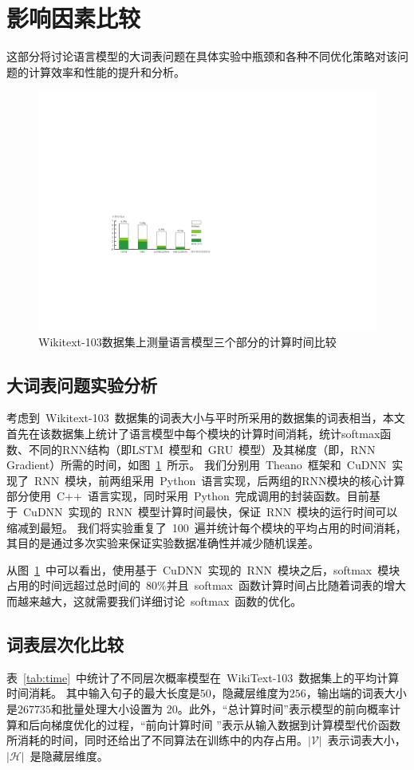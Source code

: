 \section{影响因素比较}

这部分将讨论语言模型的大词表问题在具体实验中瓶颈和各种不同优化策略对该问题的计算效率和性能的提升和分析。
\begin{figure}[!b]
  \centering
  \includegraphics[width=.9\columnwidth]{./figures/rnn_timing.pdf}
  \caption{Wikitext-103数据集上测量语言模型三个部分的计算时间比较}\label{fig:rnn_timing}
\end{figure}
\subsection{大词表问题实验分析}

考虑到~Wikitext-103~数据集的词表大小与平时所采用的数据集的词表相当，本文首先在该数据集上统计了语言模型中每个模块的计算时间消耗，统计softmax函数、不同的RNN结构（即LSTM~模型和~GRU~模型）及其梯度（即，RNN Gradient）所需的时间，如图~\ref{fig:rnn_timing}~所示。
我们分别用~Theano~框架和~CuDNN~实现了~RNN~模块，前两组采用~Python~语言实现，后两组的RNN模块的核心计算部分使用~C++~语言实现，同时采用~Python~完成调用的封装函数。目前基于~CuDNN~实现的~RNN~模型计算时间最快，保证~RNN~模块的运行时间可以缩减到最短。 我们将实验重复了~100~遍并统计每个模块的平均占用的时间消耗，其目的是通过多次实验来保证实验数据准确性并减少随机误差。


从图~\ref{fig:rnn_timing}~中可以看出，使用基于~CuDNN~实现的~RNN~模块之后，softmax~模块占用的时间远超过总时间的~80\%并且~softmax~函数计算时间占比随着词表的增大而越来越大，这就需要我们详细讨论~softmax~函数的优化。


\subsection{词表层次化比较}
表~\ref{tab:time}~中统计了不同层次概率模型在~WikiText-103~数据集上的平均计算时间消耗。
其中输入句子的最大长度是$50$，隐藏层维度为$256$，输出端的词表大小是$267735$和批量处理大小设置为 20。此外，``总计算时间''表示模型的前向概率计算和后向梯度优化的过程，``前向计算时间 ''表示从输入数据到计算模型代价函数所消耗的时间，同时还给出了不同算法在训练中的内存占用。$\mathcal{|V|}$~表示词表大小，$\mathcal{|H|}$~是隐藏层维度。

